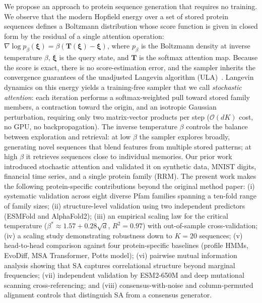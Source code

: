 We propose an approach to protein sequence generation that requires no training. We observe that the modern Hopfield energy over a set of stored protein sequences defines a Boltzmann distribution whose score function is given in closed form by the residual of a single attention operation: $\nabla \log p_\beta(\boldsymbol{\xi}) = \beta(\mathbf{T}(\boldsymbol{\xi}) - \boldsymbol{\xi})$, where $p_\beta$ is the Boltzmann density at inverse temperature $\beta$, $\boldsymbol{\xi}$ is the query state, and $\mathbf{T}$ is the softmax attention map. Because the score is exact, there is no score-estimation error, and the sampler inherits the convergence guarantees of the unadjusted Langevin algorithm (ULA)~\cite{durmusNonasymptoticAnalysisUnadjusted2017,dalalyanTheoreticalGuaranteesApproximate2017}. Langevin dynamics on this energy yields a training-free sampler that we call \emph{stochastic attention}: each iteration performs a softmax-weighted pull toward stored family members, a contraction toward the origin, and an isotropic Gaussian perturbation, requiring only two matrix-vector products per step ($\mathcal{O}(dK)$ cost, no GPU, no backpropagation). The inverse temperature $\beta$ controls the balance between exploration and retrieval: at low $\beta$ the sampler explores broadly, generating novel sequences that blend features from multiple stored patterns; at high $\beta$ it retrieves sequences close to individual memories. Our prior work~\cite{alswaidanVarnerStochasticAttention2026} introduced stochastic attention and validated it on synthetic data, MNIST digits, financial time series, and a single protein family (RRM). The present work makes the following protein-specific contributions beyond the original method paper: (i) systematic validation across eight diverse Pfam families spanning a ten-fold range of family sizes; (ii) structure-level validation using two independent predictors (ESMFold and AlphaFold2); (iii) an empirical scaling law for the critical temperature ($\beta^* \approx 1.57 + 0.28\sqrt{d}$, $R^2{=}0.97$) with out-of-sample cross-validation; (iv) a scaling study demonstrating robustness down to $K{=}20$ sequences; (v) head-to-head comparison against four protein-specific baselines (profile HMMs, EvoDiff, MSA Transformer, Potts model); (vi) pairwise mutual information analysis showing that SA captures correlational structure beyond marginal frequencies; (vii) independent validation by ESM2-650M and deep mutational scanning cross-referencing; and (viii) consensus-with-noise and column-permuted alignment controls that distinguish SA from a consensus generator.

